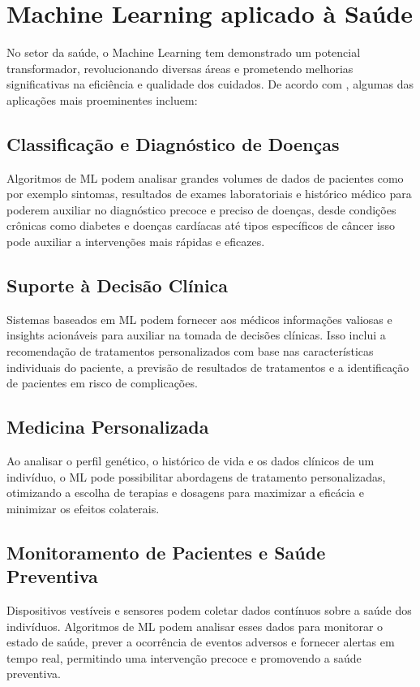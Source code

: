 \section{Machine Learning aplicado à Saúde}
No setor da saúde, o Machine Learning tem demonstrado um potencial transformador, revolucionando diversas áreas e prometendo melhorias significativas na eficiência e qualidade dos cuidados. De acordo com \cite{AlZubaidi2021}, algumas das aplicações mais proeminentes incluem:

\subsection{Classificação e Diagnóstico de Doenças}
Algoritmos de ML podem analisar grandes volumes de dados de pacientes como por exemplo sintomas, resultados de exames laboratoriais e histórico médico para poderem auxiliar no diagnóstico precoce e preciso de doenças, desde condições crônicas como diabetes e doenças cardíacas até tipos específicos de câncer isso pode auxiliar a intervenções mais rápidas e eficazes.

\subsection{Suporte à Decisão Clínica}
Sistemas baseados em ML podem fornecer aos médicos informações valiosas e insights acionáveis para auxiliar na tomada de decisões clínicas. Isso inclui a recomendação de tratamentos personalizados com base nas características individuais do paciente, a previsão de resultados de tratamentos e a identificação de pacientes em risco de complicações.

\subsection{Medicina Personalizada}
Ao analisar o perfil genético, o histórico de vida e os dados clínicos de um indivíduo, o ML pode possibilitar abordagens de tratamento personalizadas, otimizando a escolha de terapias e dosagens para maximizar a eficácia e minimizar os efeitos colaterais.

\subsection{Monitoramento de Pacientes e Saúde Preventiva}
Dispositivos vestíveis e sensores podem coletar dados contínuos sobre a saúde dos indivíduos. Algoritmos de ML podem analisar esses dados para monitorar o estado de saúde, prever a ocorrência de eventos adversos e fornecer alertas em tempo real, permitindo uma intervenção precoce e promovendo a saúde preventiva.

